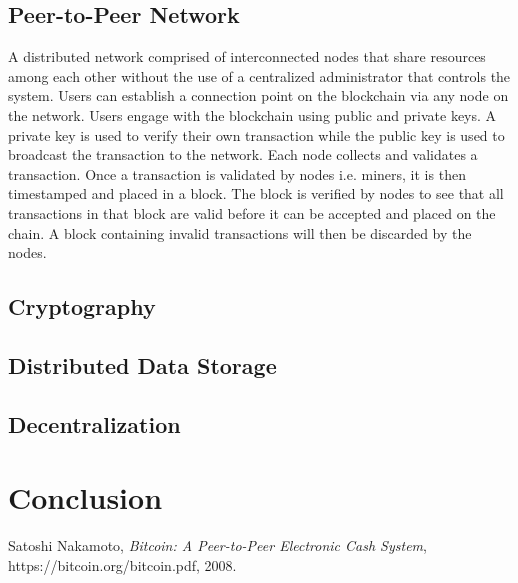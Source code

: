 \documentclass[report]{IEEEtran}
\begin{document}
\subsection{Peer-to-Peer Network}
A distributed network comprised of interconnected nodes that share resources among each other without the use of a centralized administrator that controls the system. Users can establish a connection point on the blockchain via any node on the network. Users engage with the blockchain using public and private keys. A private key is used to verify their own transaction while the public key is used to broadcast the transaction to the network. Each node collects and validates a transaction. Once a transaction is validated by nodes i.e. miners, it is then timestamped and placed in a block. The block is verified by nodes to see that all transactions in that block are valid before it can be accepted and placed on the chain. A block containing invalid transactions will then be discarded by the nodes. 
\subsection{Cryptography}
\subsection{Distributed Data Storage}
\subsection{Decentralization}
\section{Conclusion}

\begin{thebibliography}{1}

Satoshi Nakamoto, \emph{Bitcoin: A Peer-to-Peer Electronic Cash System}, https://bitcoin.org/bitcoin.pdf, 2008.

\end{thebibliography}
\end{document}
